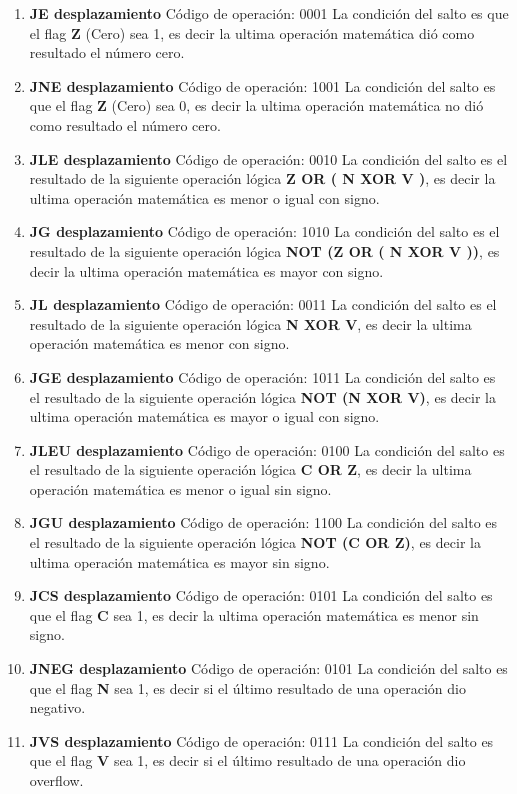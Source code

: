 \begin{enumerate}
\item \textbf{JE desplazamiento}
Código de operación: 0001
La condición del salto es que el flag \textbf{Z} (Cero) sea 1, es decir la ultima operación matemática dió como resultado el número cero.

\item \textbf{JNE desplazamiento}
Código de operación: 1001
La condición del salto es que el flag \textbf{Z} (Cero) sea 0, es decir la ultima operación matemática no dió como resultado el número cero.

\item \textbf{JLE desplazamiento}
Código de operación: 0010
La condición del salto es el resultado de la siguiente operación lógica \textbf{Z OR ( N XOR V )}, es decir la ultima operación matemática es menor o igual con signo.

\item \textbf{JG desplazamiento}
Código de operación: 1010
La condición del salto es el resultado de la siguiente operación lógica \textbf{NOT (Z OR ( N XOR V ))}, es decir la ultima operación matemática es mayor con signo.

\item \textbf{JL desplazamiento}
Código de operación: 0011
La condición del salto es el resultado de la siguiente operación lógica \textbf{N XOR V}, es decir la ultima operación matemática es menor con signo.

\item \textbf{JGE desplazamiento}
Código de operación: 1011
La condición del salto es el resultado de la siguiente operación lógica \textbf{NOT (N XOR V)}, es decir la ultima operación matemática es mayor o igual con signo.

\item \textbf{JLEU desplazamiento}
Código de operación: 0100
La condición del salto es el resultado de la siguiente operación lógica \textbf{C OR Z}, es decir la ultima operación matemática es menor o igual sin signo.

\item \textbf{JGU desplazamiento}
Código de operación: 1100
La condición del salto es el resultado de la siguiente operación lógica \textbf{NOT (C OR Z)}, es decir la ultima operación matemática es mayor sin signo.

\item \textbf{JCS desplazamiento}
Código de operación: 0101
La condición del salto es que el flag \textbf{C} sea 1, es decir la ultima operación matemática es menor sin signo.

\item \textbf{JNEG desplazamiento}
Código de operación: 0101
La condición del salto es que el flag \textbf{N} sea 1, es decir si el último resultado de una operación dio negativo.

\item \textbf{JVS desplazamiento}
Código de operación: 0111
La condición del salto es que el flag \textbf{V} sea 1, es decir si el último resultado de una operación dio overflow.

\end{enumerate}


